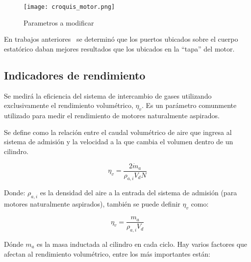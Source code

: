 
\begin{figure}
    \centering
    \texttt{[image: croquis\_motor.png]}
    \caption{Parametros a modificar}\label{fig:croquis_mrcvc}
\end{figure}

En trabajos anteriores~\cite{chiquito} se determinó que los puertos ubicados
sobre el cuerpo estatórico daban mejores resultados que los ubicados en la
``tapa'' del motor.

\subsection{Indicadores de rendimiento}\label{sec:indicadores_rendimiento}

Se medirá la eficiencia del sistema de intercambio de gases utilizando
exclusivamente el rendimiento volumétrico, $\eta_v$.
%
Es un parámetro comunmente utilizado para medir el rendimiento de motores
naturalmente aspirados.

%
Se define como la relación entre el caudal volumétrico de aire que ingresa
al sistema de admisión y la velocidad a la que cambia el volumen dentro de un
cilindro.

\begin{equation}\label{eq:rendVol}
  \eta_v = \frac{2 \dot{m}_a}{\rho_{a,i} V_d N}
\end{equation}

Donde: $\rho_{a,i}$ es la densidad del aire a la entrada del sistema de
admisión (para motores naturalmente aspirados), también se puede definir
$\eta_v$ como:

\begin{equation}\label{eq:rendVol2}
    \eta_v = \frac{m_a}{\rho_{a,i} V_d}
\end{equation}

Dónde $m_a$ es la masa inductada al cilindro en cada ciclo.
%
Hay varios factores que afectan al rendimiento volumétrico, entre los más
importantes están:

